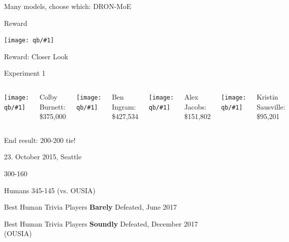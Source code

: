 \documentclass[xcolor=dvipsnames]{beamer}
\newcommand{\fsi}[2]{
\begin{frame}[plain]
\vspace*{-1pt}
\makebox[\linewidth]{\texttt{[image: \#1]}}
\begin{center}
#2
\end{center}
\end{frame}
}
\newcommand{\gfxq}[2]{
\begin{center}
	\texttt{[image: qb/\#1]}
\end{center}
}
\begin{document}
\begin{frame}{Many models, choose which: DRON-MoE}

  \only<1>{\gfxq{dron-moe}{.8}}
  \only<2>{\gfxq{dron-moe2}{.8}}

\end{frame}

\begin{frame}{Reward}

  \gfxq{dqn_results}{.5}

\end{frame}

\begin{frame}{Reward: Closer Look}

  \only<1>{\gfxq{reward1}{.8}}
  \only<2>{\gfxq{reward2}{.8}}
  \only<3>{\gfxq{reward3}{.8}}
  \only<4>{\gfxq{reward4}{.8}}
\end{frame}

\begin{frame}{Experiment 1}

		\begin{columns}
				\gfxq{colby_jeo}{1.0}
                                Colby Burnett:
                                \$375,000
				\gfxq{ben_jeo}{1.0}
                                Ben Ingram:
                                \$427,534
				\gfxq{alex_jeo}{1.0}
                                Alex Jacobs: \$151,802
				\gfxq{kristin_jeo}{1.0}
                                Kristin Sausville: \$95,201
		\end{columns}

                \pause


                \begin{center}
                End result: 200-200 tie!
                \end{center}

\end{frame}

\fsi{qb/hsnct1}{}
\fsi{qb/jennings}{23. October 2015, Seattle}
\fsi{qb/jennings_handshake}{300-160}
\fsi{qb/nasat}{Humans 345-145 (vs. OUSIA)}

\fsi{qb/hsnct_2017}{Best Human Trivia Players {\bf Barely} Defeated,
  June 2017}



\fsi{qb/hcqa}{Best Human Trivia Players {\bf Soundly} Defeated,
  December 2017 \\ (OUSIA)}
\end{document}
